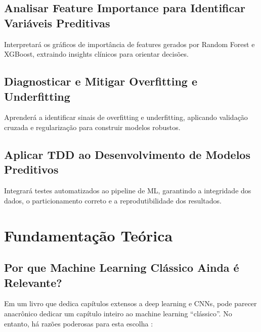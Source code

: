 \subsection{Analisar Feature Importance para Identificar Variáveis Preditivas}
Interpretará os gráficos de importância de features gerados por Random Forest e XGBoost, extraindo insights clínicos para orientar decisões.

\subsection{Diagnosticar e Mitigar Overfitting e Underfitting}
Aprenderá a identificar sinais de overfitting e underfitting, aplicando validação cruzada e regularização para construir modelos robustos.

\subsection{Aplicar TDD ao Desenvolvimento de Modelos Preditivos}
Integrará testes automatizados ao pipeline de ML, garantindo a integridade dos dados, o particionamento correto e a reprodutibilidade dos resultados.

\section{Fundamentação Teórica}

\subsection{Por que Machine Learning Clássico Ainda é Relevante?}

Em um livro que dedica capítulos extensos a deep learning e CNNs, pode parecer anacrônico dedicar um capítulo inteiro ao machine learning ``clássico''. No entanto, há razões poderosas para esta escolha :

